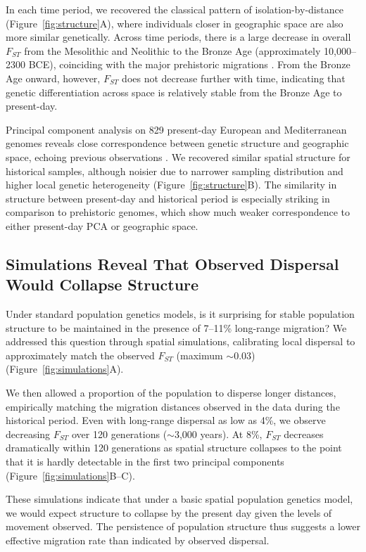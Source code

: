 \documentclass[11pt]{article}
\begin{document}
In each time period, we recovered the classical pattern of isolation-by-distance (Figure~\ref{fig:structure}A), where individuals closer in geographic space are also more similar genetically. Across time periods, there is a large decrease in overall $F_{ST}$ from the Mesolithic and Neolithic to the Bronze Age (approximately 10,000--2300 BCE), coinciding with the major prehistoric migrations \citep{Haak2015,Lazaridis2014}. From the Bronze Age onward, however, $F_{ST}$ does not decrease further with time, indicating that genetic differentiation across space is relatively stable from the Bronze Age to present-day.

Principal component analysis on 829 present-day European and Mediterranean genomes reveals close correspondence between genetic structure and geographic space, echoing previous observations \citep{Novembre2008}. We recovered similar spatial structure for historical samples, although noisier due to narrower sampling distribution and higher local genetic heterogeneity (Figure~\ref{fig:structure}B). The similarity in structure between present-day and historical period is especially striking in comparison to prehistoric genomes, which show much weaker correspondence to either present-day PCA or geographic space.

\subsection{Simulations Reveal That Observed Dispersal Would Collapse Structure}

Under standard population genetics models, is it surprising for stable population structure to be maintained in the presence of 7--11\% long-range migration? We addressed this question through spatial simulations, calibrating local dispersal to approximately match the observed $F_{ST}$ (maximum $\sim$0.03) (Figure~\ref{fig:simulations}A).

We then allowed a proportion of the population to disperse longer distances, empirically matching the migration distances observed in the data during the historical period. Even with long-range dispersal as low as 4\%, we observe decreasing $F_{ST}$ over 120 generations ($\sim$3,000 years). At 8\%, $F_{ST}$ decreases dramatically within 120 generations as spatial structure collapses to the point that it is hardly detectable in the first two principal components (Figure~\ref{fig:simulations}B--C).

These simulations indicate that under a basic spatial population genetics model, we would expect structure to collapse by the present day given the levels of movement observed. The persistence of population structure thus suggests a lower effective migration rate than indicated by observed dispersal.
\end{document}
